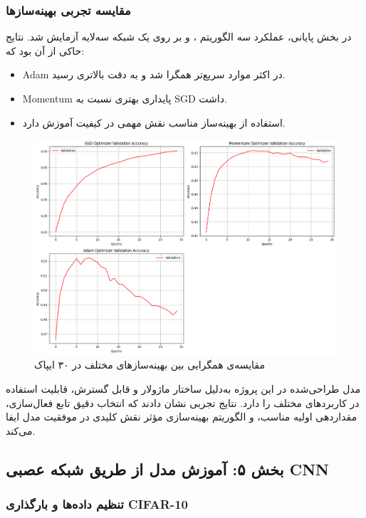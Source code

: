 	\subsubsection{مقایسه تجربی بهینه‌سازها}
	
	در بخش پایانی، عملکرد سه الگوریتم ،  و  بر روی یک شبکه سه‌لایه آزمایش شد. نتایج حاکی از آن بود که:
	
	\begin{itemize}
		\item Adam در اکثر موارد سریع‌تر همگرا شد و به دقت بالاتری رسید.
		\item Momentum پایداری بهتری نسبت به SGD داشت.
		\item استفاده از بهینه‌ساز مناسب نقش مهمی در کیفیت آموزش دارد.
	\end{itemize}
		
	\begin{figure}[h]
		\centering
		\includegraphics[width=0.7\linewidth]{images/task4-1}
		\caption{مقایسه‌ی همگرایی بین بهینه‌سازهای مختلف در ۳۰ ایپاک}
		\label{fig:task4-1}
	\end{figure}
	
	
	مدل طراحی‌شده در این پروژه به‌دلیل ساختار ماژولار و قابل گسترش، قابلیت استفاده در کاربردهای مختلف را دارد. نتایج تجربی نشان دادند که انتخاب دقیق تابع فعال‌سازی، مقداردهی اولیه مناسب، و الگوریتم بهینه‌سازی مؤثر نقش کلیدی در موفقیت مدل ایفا می‌کند.
	


\subsection{بخش ۵: آموزش مدل از طریق شبکه عصبی CNN}



		\subsubsection{تنظیم داده‌ها و بارگذاری CIFAR-10}

